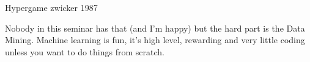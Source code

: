 \documentclass{beamer}
\begin{document}
\begin{frame}
Hypergame zwicker 1987
\end{frame}

\begin{frame}
Nobody in this seminar has that (and I'm happy) but the hard part is the Data Mining.
Machine learning is fun, it's high level, rewarding and very little coding unless you want to do things from scratch.
\end{frame}
\end{document}
